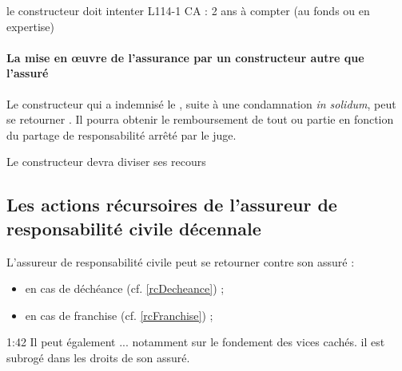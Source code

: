 				le constructeur doit intenter L114-1 CA : 2 ans à compter (au fonds ou en expertise)

			\paragraph{La mise en œuvre de l'assurance par un constructeur autre que l'assuré}

				Le constructeur qui a indemnisé le \Mo, suite à une condamnation \emph{in solidum}, peut se retourner . Il pourra obtenir le remboursement de tout ou partie en fonction du partage de responsabilité arrêté par le juge.

				Le constructeur devra diviser ses recours

	\subsection{Les actions récursoires de l'assureur de responsabilité civile décennale}

		L'assureur de responsabilité civile peut se retourner contre son assuré :
		\begin{itemize}
			\item en cas de déchéance (cf. \ref{rcDecheance}) ;
			\item en cas de franchise (cf. \ref{rcFranchise}) ;
		\end{itemize}

	1:42 Il peut également ... notamment sur le fondement des vices cachés. il est subrogé dans les droits de son assuré.
